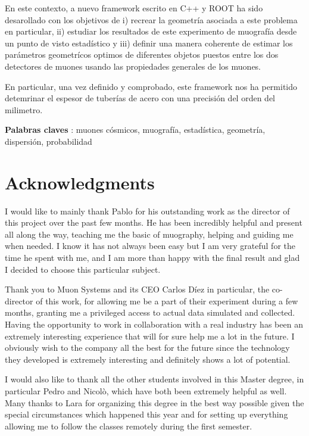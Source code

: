 \documentclass[a4paper, 11pt]{report}
\begin{document}
En este contexto, a nuevo framework escrito en C++ y ROOT ha sido desarollado con los objetivos de i) recrear la geometr\'ia asociada a este problema en particular, ii) estudiar los resultados de este experimento de muograf\'ia desde un punto de visto estad\'istico y iii) definir una manera coherente de estimar los par\'ametros geometr\'icos optimos de diferentes objetos puestos entre los dos detectores de muones usando las propiedades generales de los muones.

En particular, una vez definido y comprobado, este framework nos ha permitido detemrinar el espesor de tuber\'ias de acero con una precisi\'on del orden del milimetro. 

\begin{center}
\textbf{Palabras claves} : muones c\'osmicos, muograf\'ia, estad\'istica, geometr\'ia, dispersi\'on, probabilidad
\end{center}

\newpage


\section*{\huge{Acknowledgments}}

I would like to mainly thank Pablo for his outstanding work as the director of this project over the past few months. He has been incredibly helpful and present all along the way, teaching me the basic of muography, helping and guiding me when needed. I know it has not always been easy but I am very grateful for the time he spent with me, and I am more than happy with the final result and glad I decided to choose this particular subject.

Thank you to Muon Systems and its CEO Carlos D\'iez in particular, the co-director of this work, for allowing me be a part of their experiment during a few months, granting me a privileged access to actual data simulated and collected. Having the opportunity to work in collaboration with a real industry has been an extremely interesting experience that will for sure help me a lot in the future. I obviously wish to the company all the best for the future since the technology they developed is extremely interesting and definitely shows a lot of potential.

I would also like to thank all the other students involved in this Master degree, in particular Pedro and Nicol\`o, which have both been extremely helpful as well. Many thanks to Lara for organizing this degree in the best way possible given the special circumstances which happened this year and for setting up everything allowing me to follow the classes remotely during the first semester.
\end{document}
